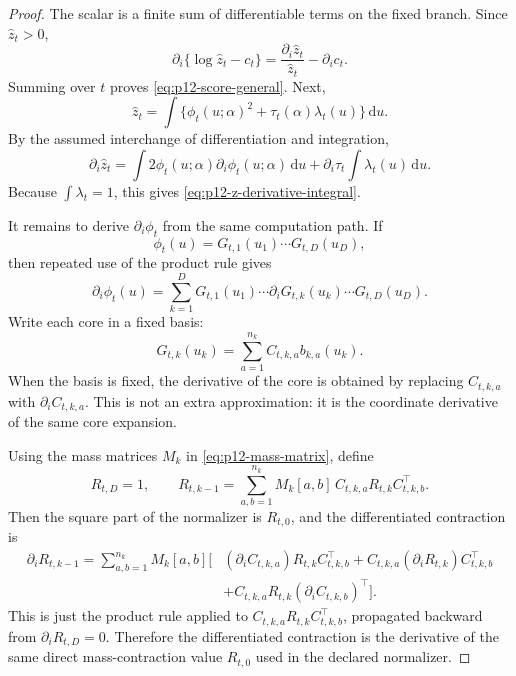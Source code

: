 \documentclass[11pt]{article}
\newcommand{\dd}{\mathrm{d}}
\theoremstyle{definition}
\theoremstyle{remark}
\begin{document}
\begin{proof}
The scalar is a finite sum of differentiable terms on the fixed branch.  Since
\(\widehat z_t>0\),
\[
  \partial_i\{\log\widehat z_t-c_t\}
  =
  \frac{\partial_i\widehat z_t}{\widehat z_t}
  -
  \partial_i c_t.
\]
Summing over \(t\) proves \eqref{eq:p12-score-general}.  Next,
\[
  \widehat z_t
  =
  \int \{\phi_t(u;\alpha)^2+\tau_t(\alpha)\lambda_t(u)\}\,\dd u.
\]
By the assumed interchange of differentiation and integration,
\[
  \partial_i\widehat z_t
  =
  \int 2\phi_t(u;\alpha)\partial_i\phi_t(u;\alpha)\,\dd u
  +
  \partial_i\tau_t\int\lambda_t(u)\,\dd u.
\]
Because \(\int\lambda_t=1\), this gives
\eqref{eq:p12-z-derivative-integral}.

It remains to derive \(\partial_i\phi_t\) from the same computation path.  If
\[
  \phi_t(u)=G_{t,1}(u_1)\cdots G_{t,D}(u_D),
\]
then repeated use of the product rule gives
\[
  \partial_i\phi_t(u)
  =
  \sum_{k=1}^D
  G_{t,1}(u_1)\cdots
  \partial_iG_{t,k}(u_k)\cdots
  G_{t,D}(u_D).
  \label{eq:p12-tt-product-rule}
\]
Write each core in a fixed basis:
\[
  G_{t,k}(u_k)
  =
  \sum_{a=1}^{n_k}C_{t,k,a}b_{k,a}(u_k).
\]
When the basis is fixed, the derivative of the core is obtained by replacing
\(C_{t,k,a}\) with \(\partial_iC_{t,k,a}\).  This is not an
extra approximation: it is the coordinate derivative of the same core
expansion.

Using the mass matrices \(M_k\) in \eqref{eq:p12-mass-matrix}, define
\[
  R_{t,D}=1,\qquad
  R_{t,k-1}
  =
  \sum_{a,b=1}^{n_k}
  M_k[a,b]\,C_{t,k,a}R_{t,k}C_{t,k,b}^\top.
  \label{eq:p12-proof-contraction}
\]
Then the square part of the normalizer is \(R_{t,0}\), and the differentiated
contraction is
\[
\begin{aligned}
  \partial_i R_{t,k-1}
  =
  \sum_{a,b=1}^{n_k}M_k[a,b]\Big[
  &(\partial_iC_{t,k,a})R_{t,k}C_{t,k,b}^\top
  +C_{t,k,a}(\partial_iR_{t,k})C_{t,k,b}^\top\\
  &+C_{t,k,a}R_{t,k}(\partial_iC_{t,k,b})^\top
  \Big].
  \label{eq:p12-contraction-derivative}
\end{aligned}
\]
This is just the product rule applied to
\(C_{t,k,a}R_{t,k}C_{t,k,b}^\top\), propagated backward from
\(\partial_iR_{t,D}=0\).  Therefore the differentiated contraction is the
derivative of the same direct mass-contraction value \(R_{t,0}\) used in the
declared normalizer.


\end{proof}
\end{document}
